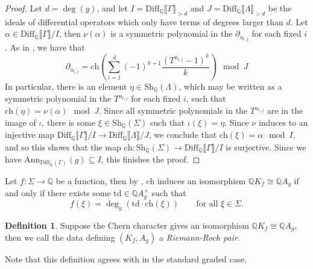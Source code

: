 \documentclass[oneside]{amsart}
\theoremstyle{plain}
\theoremstyle{definition}
\newtheorem{definition}[theorem]{Definition}
\newcommand{\Q}{{\mathbb{Q}}}
\newcommand{\Ann}{{\mathrm{Ann}}}
\newcommand{\Diff}{{\mathrm{Diff}}}
\newcommand{\Sh}{{\mathrm{Sh}}}
\newcommand{\ch}{{\mathrm{ch}}}
\newcommand{\td}{{\mathrm{td}}}
\begin{document}
\begin{proof}
    Let $d = \deg(g)$, and let $I = \Diff_\Q\llbracket \Gamma \rrbracket_{> d}$ and $J = \Diff_\Q \llbracket \Lambda \rrbracket_{> d}$ be the ideals of differential operators which only have terms of degrees larger than $d$.
    Let $\alpha \in \Diff_\Q \llbracket \Gamma \rrbracket / I$, then $\nu(\alpha)$ is a symmetric polynomial in the $\partial_{u_{i, j}}$ for each fixed $i$. As in , we have that
    \[
    \partial_{u_{i , j}} = \ch\left(\sum_{i = 1}^d (-1)^{k + 1}\frac{(T^{u_{i, j}} - 1)^k}{k}\right)
    \mod J
    \]
    In particular, there is an element $\eta \in \Sh_{\Q}(\Lambda)$, which may be written as a symmetric polynomial in the $T^{u_{i, j}}$ for each fixed $i$, such that $\ch(\eta) = \nu(\alpha) \mod J$.
    Since all symmetric polynomials in the $T^{u_{i, j}}$
    are in the image of $\iota$, there is some $\xi \in \Sh_\Q(\Sigma)$ 
    such that $\iota(\xi) = \eta$. Since $\nu$ induces to an injective map
    $\Diff_\Q\llbracket \Gamma \rrbracket/I \to\Diff_\Q\llbracket \Lambda \rrbracket/J$,
    we conclude that $\ch(\xi) = \alpha \mod I$, and so this shows that the map $\ch: \Sh_\Q(\Sigma) \to \Diff_\Q \llbracket \Gamma \rrbracket / I$ is surjective. Since we have $\Ann_{\Diff_\Q(\Gamma)}(g) \subseteq I$, this finishes the proof.
\end{proof}

Let $f: \Sigma \to \Q$ be a function, then by 
, $\ch$ induces an isomorphism $\Q K_f \cong \Q A_g$ if and only if there exists
some $\td \in \Q A_g^\times$ such that 
\[f(\xi) = \deg_g(\td \cdot \ch(\xi))\qquad\textrm{for all }\xi \in \Sigma.\]

\begin{definition}
    Suppose the Chern character gives an isomorphism $\Q K_f \cong \Q A_g$,
    then we call the data defining $(K_f, A_g)$ a \emph{Riemann-Roch pair}.
\end{definition}

Note that this definition agrees with 
in the standard graded case.
\end{document}
